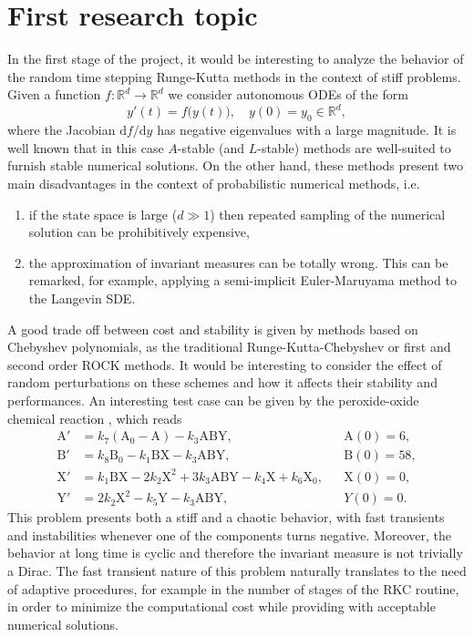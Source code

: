 \documentclass{siamart1116}
\newcommand{\R}{\mathbb{R}}
\newcommand{\dd}{\mathrm{d}}
\begin{document}
\section*{First research topic} In the first stage of the project, it would be interesting to analyze the behavior of the random time stepping Runge-Kutta methods in the context of stiff problems. Given a function $f\colon\R^d\to\R^d$ we consider autonomous ODEs of the form
\begin{equation*}
	y'(t) = f\big(y(t)\big), \quad y(0) = y_0 \in \R^d, 
\end{equation*}
where the Jacobian $\dd f / \dd y$ has negative eigenvalues with a large magnitude. It is well known that in this case $A$-stable (and $L$-stable) methods are well-suited to furnish stable numerical solutions. On the other hand, these methods present two main disadvantages in the context of probabilistic numerical methods, i.e.
\begin{enumerate}
	\item if the state space is large ($d \gg 1$) then repeated sampling of the numerical solution can be prohibitively expensive,
	\item the approximation of invariant measures can be totally wrong. This can be remarked, for example, applying a semi-implicit Euler-Maruyama method to the Langevin SDE.
\end{enumerate}
A good trade off between cost and stability is given by methods based on Chebyshev polynomials, as the traditional Runge-Kutta-Chebyshev or first and second order ROCK methods. It would be interesting to consider the effect of random perturbations on these schemes and how it affects their stability and performances. An interesting test case can be given by the peroxide-oxide chemical reaction \cite{AbG17}, which reads
\begin{equation*}
\begin{aligned}
\mathrm{A}' &= k_7  (\mathrm{A}_0 - \mathrm{A}) - k_3  \mathrm{A}\mathrm{B}\mathrm{Y}, &&\mathrm{A}(0) = 6, \\
\mathrm{B}' &= k_8\mathrm{B}_0 - k_1  \mathrm{B}\mathrm{X} - k_3  \mathrm{A}\mathrm{B}\mathrm{Y}, &&\mathrm{B}(0) = 58, \\
\mathrm{X}' &= k_1  \mathrm{B}\mathrm{X} - 2  k_2  \mathrm{X}^2 + 3  k_3 \mathrm{A}\mathrm{B}\mathrm{Y} - k_4  \mathrm{X} + k_6\mathrm{X}_0,&& \mathrm{X}(0) = 0, \\
\mathrm{Y}' &= 2  k_2  \mathrm{X}^2 - k_5  \mathrm{Y} - k_3  \mathrm{A}\mathrm{B}\mathrm{Y}, && Y(0) = 0.
\end{aligned}
\end{equation*}
This problem presents both a stiff and a chaotic behavior, with fast transients and instabilities whenever one of the components turns negative. Moreover, the behavior at long time is cyclic and therefore the invariant measure is not trivially a Dirac. The fast transient nature of this problem naturally translates to the need of adaptive procedures, for example in the number of stages of the RKC routine, in order to minimize the computational cost while providing with acceptable numerical solutions.
\end{document}
